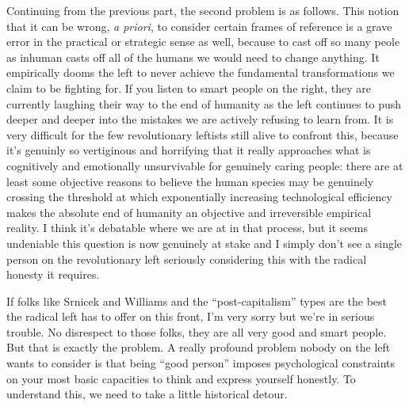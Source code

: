 \documentclass[a4paper,12pt,margin=.5in]{article}
\begin{document}
Continuing from the previous part, the second problem is as follows.
This notion that it can be wrong, \emph{a priori}, to consider certain
frames of reference is a grave error in the practical or strategic sense
as well, because to cast off so many peole as inhuman casts off all of
the humans we would need to change anything. It empirically dooms the
left to never achieve the fundamental transformations we claim to be
fighting for. If you listen to smart people on the right, they are
currently laughing their way to the end of humanity as the left
continues to push deeper and deeper into the mistakes we are actively
refusing to learn from. It is very difficult for the few revolutionary
leftists still alive to confront this, because it's genuinly so
vertiginous and horrifying that it really approaches what is cognitively
and emotionally unsurvivable for genuinely caring people: there are at
least some objective reasons to believe the human species may be
genuinely crossing the threshold at which exponentially increasing
technological efficiency makes the absolute end of humanity an objective
and irreversible empirical reality. I think it's debatable where we are
at in that process, but it seems undeniable this question is now
genuinely at stake and I simply don't see a single person on the
revolutionary left seriously considering this with the radical honesty
it requires.

If folks like Srnicek and Williams and the ``post-capitalism'' types are
the best the radical left has to offer on this front, I'm very sorry but
we're in serious trouble. No disrespect to those folks, they are all
very good and smart people. But that is exactly the problem. A really
profound problem nobody on the left wants to consider is that being
``good person'' imposes psychological constraints on your most basic
capacities to think and express yourself honestly. To understand this,
we need to take a little historical detour.
\end{document}
